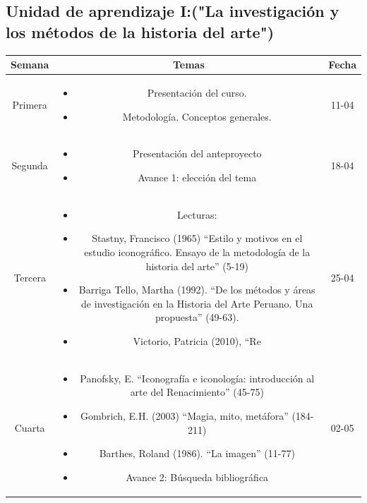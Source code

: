 \documentclass[a4paper]{article}
\begin{document}
\subsection{Unidad de aprendizaje I:("La investigación y los métodos de la historia del arte")}
\begin{table}[ht]
\centering
\begin{tabular}{|c|c|c|}
\hline
\textbf{Semana} & \textbf{Temas} & \textbf{Fecha} \\ 
\hline
Primera 
& \begin{minipage}[t]{10cm}
\begin{itemize}
\item Presentación del curso.
\item Metodología. Conceptos generales.
\end{itemize}
\end{minipage} & 11-04\\ 
\hline 
Segunda 
& \begin{minipage}[t]{10cm}
\begin{itemize}
\item Presentación del anteproyecto
\item Avance 1: elección del tema
\end{itemize}
\end{minipage} & 18-04\\ 
\hline 
Tercera 
& \begin{minipage}[t]{10cm}
\begin{itemize}
\item Lecturas:
\item Stastny, Francisco (1965) “Estilo y motivos en el estudio iconográfico. Ensayo de la metodología de la historia del arte” (5-19)
\item Barriga Tello, Martha (1992). “De los métodos y áreas de investigación en la Historia del Arte Peruano. Una propuesta” (49-63).
\item Victorio, Patricia (2010), “Re
\end{itemize}
\end{minipage} & 25-04 \\ 
\hline 
Cuarta 
& \begin{minipage}[t]{10cm}
\begin{itemize}
\item Panofsky, E. “Iconografía e iconología: introducción al arte del Renacimiento” (45-75)
\item Gombrich, E.H. (2003) “Magia, mito, metáfora” (184-211)
\item Barthes, Roland (1986). “La imagen” (11-77)
\item Avance 2: Búsqueda bibliográfica
\end{itemize}
\end{minipage} & 02-05 \\ 
\hline 
\end{tabular}
\end{table} 
\newpage
\end{document}

